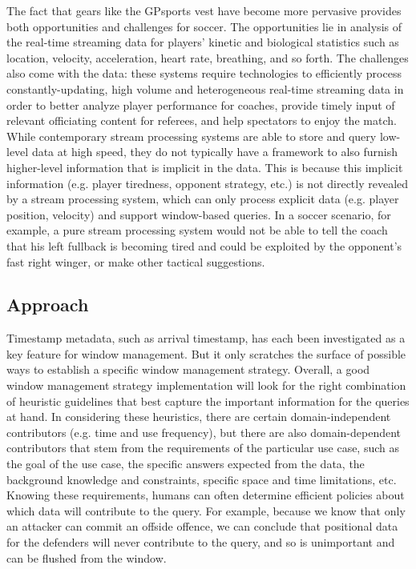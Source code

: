 The fact that gears like the GPsports vest have become more pervasive provides both opportunities and challenges for soccer. 
The opportunities lie in analysis of the real-time streaming data for players' kinetic and biological statistics such as location, velocity, acceleration, heart rate, breathing, and so forth. 
The challenges also come with the data: these systems require technologies to efficiently process constantly-updating, high volume and heterogeneous real-time streaming data in order to better analyze player performance for coaches, provide timely input of relevant officiating content for referees, and help spectators to enjoy the match. 
While contemporary stream processing systems are able to store and query low-level data at high speed, they do not typically have a framework to also furnish higher-level information that is implicit in the data.  
This is because this implicit information (e.g. player tiredness, opponent strategy, etc.) is not directly revealed by a stream processing system, which can only process explicit data (e.g. player position, velocity) and support window-based queries.  
In a soccer scenario, for example, a pure stream processing system would not be able to tell the coach that his left fullback is becoming tired and could be exploited by the opponent's fast right winger, or make other tactical suggestions. 
%
\subsection{Approach}
Timestamp metadata, such as arrival timestamp, has each been investigated as a key feature for window management.
But it only scratches the surface of possible ways to establish a specific window management strategy. 
Overall, a good window management strategy implementation will look for the right combination of heuristic guidelines that best capture the important information for the queries at hand.
In considering these heuristics, there are certain domain-independent contributors (e.g. time and use frequency), but there are also domain-dependent contributors that stem from the requirements of the particular use case, such as the goal of the use case, the specific answers expected from the data, the background knowledge and constraints, specific space and time limitations, etc. 
Knowing these requirements, humans can often determine efficient policies about which data will contribute to the query. 
For example, because we know that only an attacker can commit an offside offence, we can conclude that positional data for the defenders will never contribute to the query, and so is unimportant and can be flushed from the window.  
%
